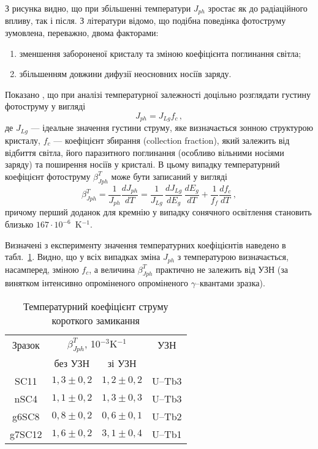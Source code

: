 З рисунка видно, що при збільшенні температури $J_{ph}$ зростає як до радіаційного впливу, так і після.
З літератури \cite{Faren,SCTemp:PP11,SCTemp:SEMSC140} відомо, що
подібна поведінка фотоструму зумовлена, переважно, двома факторами:
\begin{enumerate}[label=\arabic*),leftmargin=0em,itemindent=1.5em]
\item зменшення забороненої кристалу та зміною коефіцієнта поглинання світла;
\item збільшенням довжини дифузії неосновних носіїв заряду.
\end{enumerate}
Показано \cite{SCTemp:PP11,SCTemp:SEMSC140}, що при аналізі температурної залежності доцільно
розглядати густину фотоструму у вигляді
\begin{equation}
\label{eqIscIdeal}
J_{ph}=J_{Lg}f_c\,,
\end{equation}
де
$J_{Lg}$ --- ідеальне значення густини струму, яке визначається
зонною структурою кристалу,
$f_c$ --- коефіцієнт збирання (collection fraction),
який залежить від відбиття світла, його паразитного поглинання (особливо вільними носіями заряду)
та поширення носіїв у кристалі.
В цьому випадку температурний коефіцієнт фотоструму $\beta^T_{Jph}$ може бути записаний у вигляді
\begin{equation}
\label{eqIscTempKoef}
\beta^T_{Jph}=\frac{1}{J_{ph}}\frac{dJ_{ph}}{dT}=\frac{1}{J_{Lg}}\,\frac{dJ_{Lg}}{dE_g}\,\frac{dE_g}{dT}+\frac{1}{f_{f}}\frac{df_{c}}{dT}\,,
\end{equation}
причому перший доданок для кремнію у випадку сонячного освітлення становить близько $167\cdot10^{-6}$~K$^{-1}$.

Визначені з експерименту значення температурних коефіцієнтів наведено в табл.~\ref{tabIscT}.
Видно, що у всіх випадках зміна $J_{ph}$ з температурою визначається, насамперед,
зміною $f_c$, а величина $\beta^T_{Jph}$ практично не залежить від УЗН (за винятком інтенсивно опроміненого опроміненого $\gamma$--квантами зразка).

\begin{table}
\caption{\label{tabIscT}Температурний коефіцієнт струму короткого замикання
}
\center
\begin{tabular}{|c|c|c|c|}
\hline
Зразок&\multicolumn{2}{c|}{$\beta^T_{Jph}$, 10$^{-3}$K$^{-1}$}&УЗН\\ \cline{2-3}
&без УЗН & зі УЗН&\\ \hline
SC11&$1,3\pm0,2$&$1,2\pm0,2$&U--Tb3\\ \hline
nSC4&$1,1\pm0,2$&$1,3\pm0,3$&U--Tb3\\ \hline
g6SC8&$0,8\pm0,2$&$0,6\pm0,1$&U--Tb2\\ \hline
g7SC12&$1,6\pm0,2$&$3,1\pm0,4$&U--Tb1\\ \hline
\end{tabular}
\end{table}

